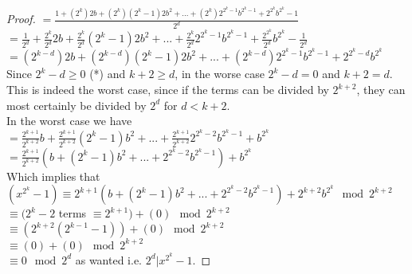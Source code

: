 \documentclass{article}
\begin{document}
\begin{flushleft}
\begin{proof}
        \hspace{.665in} $\displaystyle =\frac{1+(2^k)2b+(2^k)(2^k-1)2b^2+...+(2^k)2^{2^k-1}b^{2^k-1}+2^{2^k}b^{2^k}-1}{2^d}$\\\vspace{.05in}
        \hspace{.665in} $\displaystyle=\frac{1}{2^d}+\frac{2^k}{2^d}2b+\frac{2^k}{2^d}(2^k-1)2b^2+...+\frac{2^k}{2^d}2^{2^k-1}b^{2^k-1}+\frac{2^{2^k}}{2^d}b^{2^k}-\frac{1}{2^d}$\\\vspace{.05in}
        \hspace{.665in} $\displaystyle=(2^{k-d})2b+(2^{k-d})(2^k-1)2b^2+...+(2^{k-d})2^{2^k-1}b^{2^k-1}+2^{2^k-d}b^{2^k}$\\\vspace{.15in}
        Since $2^k-d\ge 0$ (*) and $k+2\ge d$, in the worse case $2^k-d=0$ and $k+2=d$. This is indeed the worst case, since if the terms can be divided by $2^{k+2}$, they can most certainly be divided by $2^d$ for $d<k+2$.\\\vspace{.05in}
        In the worst case we have\\\vspace{.05in}
        \hspace{.665in} $\displaystyle=\frac{2^{k+1}}{2^{k+2}}b+\frac{2^{k+1}}{2^{k+2}}(2^k-1)b^2+...+\frac{2^{k+1}}{2^{k+2}}2^{2^k-2}b^{2^k-1}+b^{2^k}$\\\vspace{.05in}
        \hspace{.665in} $\displaystyle=\frac{2^{k+1}}{2^{k+2}}\left(b+(2^k-1)b^2+...+2^{2^k-2}b^{2^k-1}\right)+b^{2^k}$\\\vspace{.1in}
        Which implies that \\\vspace{.05in}
        \hspace{.2in} $(x^{2^k}-1)\equiv 2^{k+1}\left(b+(2^k-1)b^2+...+2^{2^k-2}b^{2^k-1}\right)+2^{k+2}b^{2^k}\mod 2^{k+2}$\\\vspace{.05in}
        \hspace{.79in} $\equiv(2^k-2$ terms $\equiv 2^{k+1}) + (0) \mod 2^{k+2}$\\\vspace{.05in}
        \hspace{.79in} $\equiv(2^{k+2}(2^{k-1}-1))+(0)\mod 2^{k+2}$\\\vspace{.05in}
        \hspace{.79in} $\equiv(0)+(0)\mod 2^{k+2}$\\\vspace{.05in}
        \hspace{.79in} $\equiv 0\mod 2^d$ as wanted i.e. $2^d|x^{2^k}-1$. 


\end{proof}
\end{flushleft}
\end{document}
